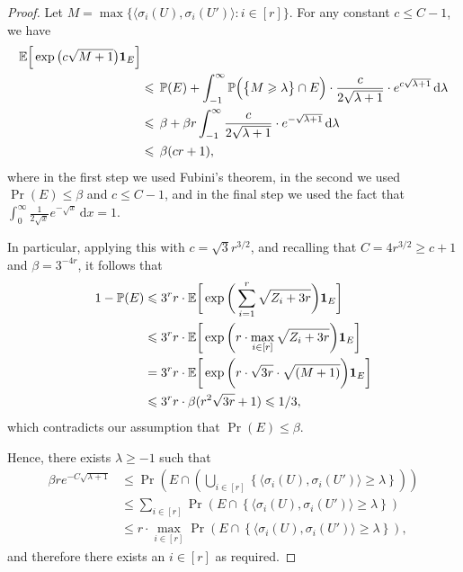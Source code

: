 \begin{proof}
    Let $M = \max \big\{ \big\langle \sigma_i(U),\sigma_i(U') \big\rangle : i \in [r] \big\}$. For any constant $c \le C - 1$, we have
    \begin{align*}
      \Ex\Big[ \exp\big( c \sqrt{M + 1} \big) \mathbf{1}_E \Big]
      & %
      \\
      & \le \, \Pr(E) + \int_{-1}^\infty \Pr\Big( \big\{ M \ge \lambda \big\} \cap E \Big) \cdot \frac{c}{2\sqrt{\lambda + 1}} \cdot e^{c \sqrt{\lambda + 1}} \,\mathrm{d}\lambda\\ %
      & \le \, \beta + \beta r \int_{-1}^\infty \frac{c}{2\sqrt{\lambda + 1}} \cdot e^{- \sqrt{\lambda + 1}} \,\mathrm{d}\lambda\\
      & \le \, \beta (cr + 1),
    \end{align*}
    where in the first step we used Fubini's theorem, in the second we used $\Pr(E) \le \beta$ and $c \le C - 1$, and in the final step we used the fact that $\int_0^\infty \frac{1}{2\sqrt{x}} e^{-\sqrt{x}} \, \mathrm{d}x = 1$.

    In particular, applying this with $c = \sqrt{3}r^{3/2}$, and recalling that $C = 4r^{3/2} \ge c + 1$ and $\beta = 3^{-4r}$, it follows that
    \begin{align}
      1 - \mathbb{P}(E) &\leqslant 3^r r \cdot \mathbb{E}\bigg[ \exp\bigg( \sum_{i = 1}^r \sqrt{ Z_i + 3r } \bigg) \mathbf{1}_E \bigg]\\
      &\leqslant  3^r r \cdot \mathbb{E}\bigg[ \exp\bigg( r \cdot \max_{i \in [r]} \sqrt{ Z_i + 3r } \bigg) \mathbf{1}_E \bigg]\\
      &= 3^r r \cdot \mathbb{E}\bigg[ \exp\bigg( r \cdot \sqrt{ 3r} \cdot \sqrt{ (M + 1) } \bigg) \mathbf{1}_E \bigg]\\
      &\leqslant 3^r r \cdot \beta (r^{2}\sqrt{3r} + 1) \leqslant 1/3,
    \end{align}
    which contradicts our assumption that $\Pr(E) \le \beta$.

    Hence, there exists $\lambda \ge -1$ such that
    \begin{align}\label{eq:max:big:and:E}
      \beta r e^{-C\sqrt{\lambda + 1}} &\le \Pr\left(E \cap \left( \bigcup_{i \in [r]} \left\{ \big\langle \sigma_i(U),\sigma_i(U') \big\rangle \ge \lambda \right\}\right)   \right) \\
      &\le \sum_{i \in [r]} \Pr\left(E \cap \left\{ \big\langle \sigma_i(U),\sigma_i(U') \big\rangle \ge \lambda \right\} \right)\\
      &\le r \cdot \max_{i \in [r]} \Pr\left(E \cap \left\{ \big\langle \sigma_i(U),\sigma_i(U') \big\rangle \ge \lambda \right\} \right) ,
    \end{align}
    and therefore there exists an $i \in [r]$ as required.

  \end{proof}

